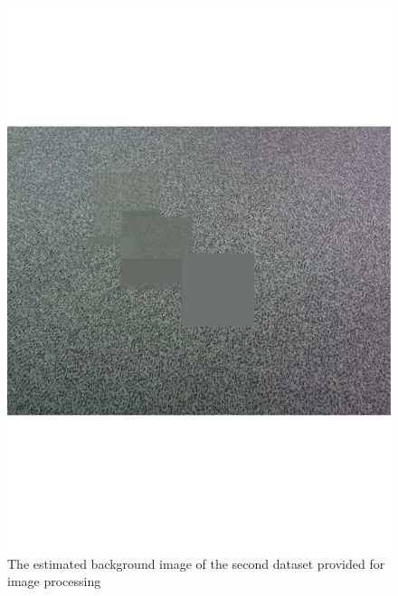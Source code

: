 \documentclass{article}
\begin{document}
\begin{figure}[h!]
\begin{minipage}[b]{0.5\linewidth}
\includegraphics[scale=0.3]{../Drawings/backdata2.pdf}
\caption{The estimated background image of the second dataset provided for image processing}
\label{fig:backdata2}
\end{minipage}
\end{figure}
\end{document}
